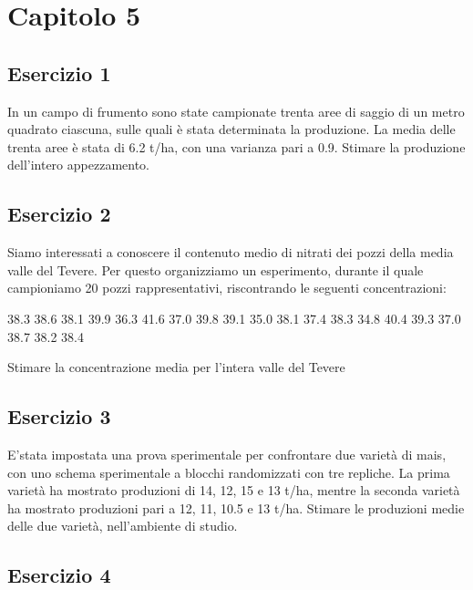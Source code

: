 \documentclass[a4paper,12pt,oneside]{book}
\begin{document}
\hypertarget{capitolo-5}{%
\section{Capitolo 5}\label{capitolo-5}}

\hypertarget{esercizio-1-3}{%
\subsection{Esercizio 1}\label{esercizio-1-3}}

In un campo di frumento sono state campionate trenta aree di saggio di un metro quadrato ciascuna, sulle quali è stata determinata la produzione. La media delle trenta aree è stata di 6.2 t/ha, con una varianza pari a 0.9. Stimare la produzione dell'intero appezzamento.

\hypertarget{esercizio-2-2}{%
\subsection{Esercizio 2}\label{esercizio-2-2}}

Siamo interessati a conoscere il contenuto medio di nitrati dei pozzi della media valle del Tevere. Per questo organizziamo un esperimento, durante il quale campioniamo 20 pozzi rappresentativi, riscontrando le seguenti concentrazioni:

38.3 38.6 38.1 39.9 36.3 41.6 37.0 39.8 39.1
35.0 38.1 37.4 38.3 34.8 40.4 39.3 37.0 38.7
38.2 38.4

Stimare la concentrazione media per l'intera valle del Tevere

\hypertarget{esercizio-3-2}{%
\subsection{Esercizio 3}\label{esercizio-3-2}}

E'stata impostata una prova sperimentale per confrontare due varietà di mais, con uno schema sperimentale a blocchi randomizzati con tre repliche. La prima varietà ha mostrato produzioni di 14, 12, 15 e 13 t/ha, mentre la seconda varietà ha mostrato produzioni pari a 12, 11, 10.5 e 13 t/ha. Stimare le produzioni medie delle due varietà, nell'ambiente di studio.

\hypertarget{esercizio-4-1}{%
\subsection{Esercizio 4}\label{esercizio-4-1}}
\end{document}
